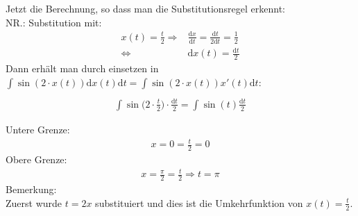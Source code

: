 Jetzt die Berechnung, so dass man die Substitutionsregel erkennt:\\
NR.: Substitution mit:\\
\begin{align*}
x(t)=\frac{t}{2}\Rightarrow& \frac{\mathrm{d}x}{\mathrm{d}t}=\frac{\mathrm{d}t}{2\mathrm{d}t}=\frac{1}{2}\\
\Leftrightarrow&\mathrm{d}x(t)=\frac{\mathrm{d}t}{2}
\end{align*}
Dann erhält man durch einsetzen in $\int\limits_{}^{} \sin(2\cdot x(t))\mathrm{d}x(t) \mathrm{d}t=\int\limits_{}^{} \sin(2\cdot x(t))x' (t) \mathrm{d}t $:\\
\begin{align*}
\int\limits_{}^{} \sin\bigg(2\cdot \frac{t}{2}\bigg)\cdot \frac{\mathrm{d}t}{2}=\int\limits_{}^{} \sin(t)\frac{\mathrm{d}t}{2}\\
\end{align*}
Untere Grenze:\\
\begin{align*}
x=0=\frac{t}{2}=0
\end{align*}
Obere Grenze:\\
\begin{align*}
x=\frac{\pi}{2}=\frac{t}{2}\Rightarrow t=\pi
\end{align*}
Bemerkung:\\
Zuerst wurde $ t=2x $ substituiert und dies ist die Umkehrfunktion von $ x(t)=\frac{t}{2} $.
